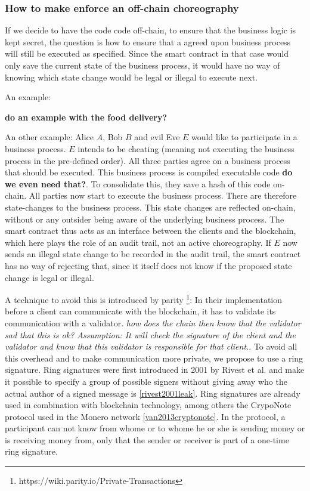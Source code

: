 \documentclass[runningheads]{llncs}
\begin{document}
\subsubsection{How to make enforce an off-chain choreography}

If we decide to have the code code off-chain, to ensure that the business logic is kept secret, the question is how to ensure that a agreed upon business process will still be executed as specified. Since the smart contract in that case would only save the current state of the business process, it would have no way of knowing which state change would be legal or illegal to execute next. 

An example: 

\textbf{do an example with the food delivery?}

An other example: Alice $A$, Bob $B$ and evil Eve $E$ would like to participate in a business process. $E$ intends to be cheating (meaning not executing the business process in the pre-defined order). All three parties agree on a business process that should be executed. This business process is compiled executable code \textbf{do we even need that?}. To consolidate this, they save a hash of this code on-chain. All parties now start to execute the business process. There are therefore state-changes to the business process. This state changes are reflected on-chain, without or any outsider being aware of the underlying business process. The smart contract thus acts as an interface between the clients and the blockchain, which here plays the role of an audit trail, not an active choreography. If $E$ now sends an illegal state change to be recorded in the audit trail, the smart contract has no way of rejecting that, since it itself does not know if the proposed state change is legal or illegal.

A technique to avoid this is introduced by parity \footnote{https://wiki.parity.io/Private-Transactions}: In their implementation before a client can communicate with the blockchain, it has to validate its communication with a validator. \textit{how does the chain then know that the validator sad that this is ok? Assumption: It will check the signature of the client and the validator and know that this validator is responsible for that client.}. To avoid all this overhead and to make communication more private, we propose to use a ring signature. Ring signatures were first introduced in 2001 by Rivest et al. and make it possible to specify a group of possible signers without giving away who the actual author of a signed message is \ref{rivest2001leak}. Ring signatures are already used in combination with blockchain technology, among others the CrypoNote protocol used in the Monero network \ref{van2013cryptonote}. In the protocol, a participant can not know from whome or to whome he or she is sending money or is receiving money from, only that the sender or receiver is part of a one-time ring signature.
\end{document}
